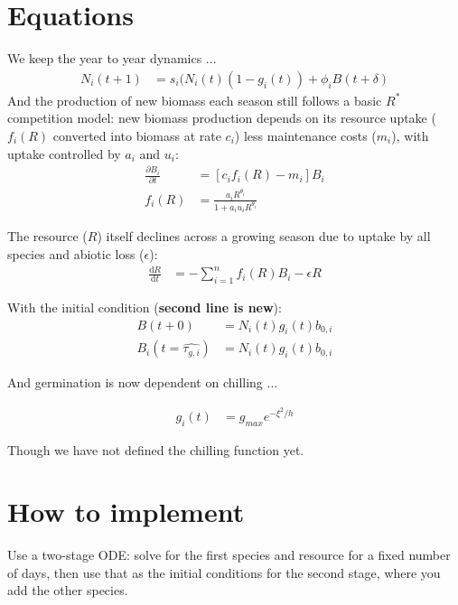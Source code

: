 \documentclass[11pt,letter]{article}
\begin{document}
\section{Equations} 
We keep the year to year dynamics ...
\begin{align}
N_{i}(t+1) & =
s_{i}(N_{i}(t)(1-g_{i}(t))+\phi_{i}B(t+\delta)
\end{align}
And the production of new biomass each season still follows a basic $R^*$ competition model: new biomass production depends on its resource uptake ($f_i(R)$ converted into biomass at rate $c_i$) less maintenance costs ($m_i$), with uptake controlled by $a_i$ and $u_i$:
\begin{align}
\frac{\partial B_{i}}{\partial t} &  = [c_{i}f_{i}(R) - m_{i}]B_{i} \\
f_{i}(R) & = \frac{a_{i}R^{\theta_{i}}}{1+a_{i}u_{i}R^{\theta_{i}}}
\end{align}

The resource ($R$) itself declines across a growing season due to uptake by all species and abiotic loss ($\epsilon$):
\begin{align}
\frac{\mathrm{d}R}{\mathrm{d}t} & = - \sum_{i=1}^{n}f_{i}(R)B_{i} -\epsilon R
\end{align}


With the initial condition ({\bf second line is new}):
\begin{align}
B(t+0) & = N_{i}(t)g_{i}(t)b_{0,i}\\
B_i(t=\hat{\tau_{g,i}}) & = N_{i}(t)g_{i}(t)b_{0,i}
\end{align}

And germination is now dependent on chilling ...

\begin{align}
g_i(t) & = g_{max}e^{-\xi^2/h}
\end{align}

Though we have not defined the chilling function yet. 



\section{How to implement} 

Use a two-stage ODE: solve for the first species and resource for a fixed number of days, then use that as the initial conditions for the second stage, where you add the other species.

\end{document}
